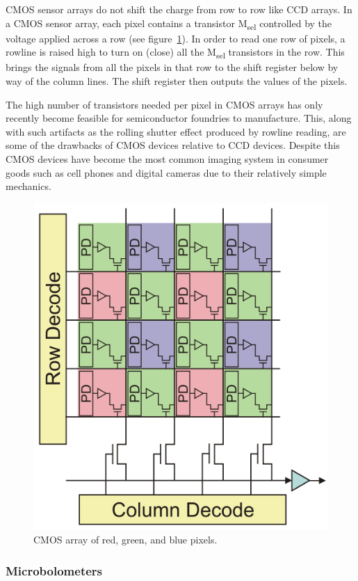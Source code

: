CMOS sensor arrays do not shift the charge from row to row like CCD arrays.
%
In a CMOS sensor array, each pixel contains a transistor M\textsubscript{sel} controlled by the voltage applied across a row (see figure~\ref{fig:cmosarray}).
%
In order to read one row of pixels, a rowline is raised high to turn on (close) all the M\textsubscript{sel} transistors in the row.
%
This brings the signals from all the pixels in that row to the shift register below by way of the column lines.
%
The shift register then outputs the values of the pixels.

The high number of transistors needed per pixel in CMOS arrays has only recently become feasible for semiconductor foundries to manufacture.
%
This, along with such artifacts as the rolling shutter effect produced by rowline reading, are some of the drawbacks of CMOS devices relative to CCD devices.
%
Despite this CMOS devices have become the most common imaging system in consumer goods such as cell phones and digital cameras due to their relatively simple mechanics.
\begin{figure}[!htbp]
	\center
	\includegraphics[width=.8\linewidth,keepaspectratio]{figures/background/cmos.png}
	\caption{CMOS array of red, green, and blue pixels.}
	\label{fig:cmosarray}
\end{figure}

\subsubsection{Microbolometers}

